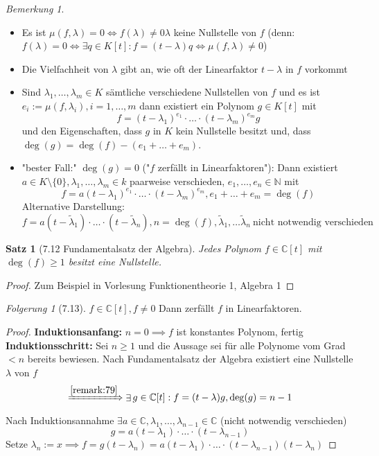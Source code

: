 \documentclass[a4paper]{scrartcl}
\DeclareMathOperator{\Exists}{\exists}
\theoremstyle{definition}
\theoremstyle{plain}
\newtheorem{thm}{Satz}
\theoremstyle{plain}
\theoremstyle{remark}
\newtheorem{remark}{Bemerkung}
\theoremstyle{remark}
\theoremstyle{remark}
\newtheorem{conc}{Folgerung}
\theoremstyle{remark}
\theoremstyle{remark}
\begin{document}
\begin{remark}
\begin{itemize}
\item Es ist $\mu(f,\lambda) = 0 \iff f(\lambda) \neq 0 \lambda$ keine Nullstelle von $f$ (denn: $f(\lambda) = 0 \iff \Exists q\in K[t]: f=(t - \lambda)q \iff \mu(f,\lambda) \neq 0$)
\item Die Vielfachheit von $\lambda$ gibt an, wie oft der Linearfaktor $t - \lambda$ in $f$ vorkommt
\item Sind $\lambda_1,\ldots,\lambda_m \in K$ sämtliche verschiedene Nullstellen von $f$ und es ist $e_i := \mu(f,\lambda_i),i = 1,\ldots,m$ dann existiert ein Polynom $g\in K[t]$ mit
\[f = (t - \lambda_1)^{e_1}\cdot\ldots\cdot(t-\lambda_m)^{e_m}g\]
und den Eigenschaften, dass $g$ in $K$ kein Nullstelle besitzt und, dass $\deg(g) = \deg(f) - (e_1 + \ldots + e_m)$.
\item "bester Fall:" $\deg(g) = 0$ ("$f$ zerfällt in Linearfaktoren"):
Dann existiert $a\in K\setminus\{0\}, \lambda_1,\ldots, \lambda_m \in k$ paarweise verschieden, $e_1,\ldots,e_n \in \mathbb{N}$  mit
\[f = a(t - \lambda_1)^{e_1}\cdot\ldots\cdot(t - \lambda_m)^{e_m}, e_1 + \ldots + e_m = \deg(f)\]
Alternative Darstellung:
\[f = a(t - \tilde\lambda_1) \cdot \ldots\cdot(t - \tilde\lambda_n), n = \deg(f), \tilde\lambda_1,\ldots\tilde\lambda_n~\text{nicht notwendig verschieden}\]
\end{itemize}
\end{remark}
\begin{thm}[7.12 Fundamentalsatz der Algebra]
Jedes Polynom $f \in \mathbb{C}[t]$ mit $\deg(f) \geq 1$ besitzt eine Nullstelle.
\end{thm}
\begin{proof}
Zum Beispiel in Vorlesung Funktionentheorie 1, Algebra 1
\end{proof}
\begin{conc}[7.13]
$f\in\mathbb{C}[t], f\neq 0$
Dann zerfällt $f$ in Linearfaktoren.
\end{conc}
\begin{proof}
\textbf{Induktionsanfang:} $n = 0 \implies f$ ist konstantes Polynom, fertig \\
  \textbf{Induktionsschritt:} Sei $n\geq 1$ und die Aussage sei für alle Polynome vom Grad $< n$ bereits bewiesen. Nach Fundamentalsatz der Algebra existiert eine Nullstelle $\lambda$ von $f$
\[\xRightarrow{\ref{remark:79}} \Exists g\in \mathbb{C}[t]: f = (t - \lambda)g, \deg(g) = n - 1 \]
Nach Induktionsannahme $\Exists a\in\mathbb{C},\lambda_1,\ldots,\lambda_{n - 1} \in \mathbb{C}$ (nicht notwendig verschieden)
\[g = a(t - \lambda_1)\cdot\ldots\cdot(t - \lambda_{n-1})\]
Setze $\lambda_n := x \implies f = g(t - \lambda_n) = a(t - \lambda_1)\cdot\ldots\cdot(t - \lambda_{n - 1})(t - \lambda_n)$
\end{proof}
\end{document}
